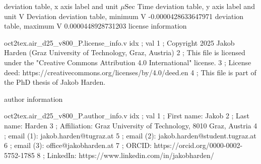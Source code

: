 \expandafter\def\csname oct2tex.air_d25_v800_P.dtabxlbl.d\endcsname{deviation table, x axis label and unit}
\expandafter\def\csname oct2tex.air_d25_v800_P.dtabxlbl.u\endcsname{\ensuremath{\mu\text{Sec}}}
\expandafter\def\csname oct2tex.air_d25_v800_P.dtabxlbl.v\endcsname{Time}
\expandafter\def\csname oct2tex.air_d25_v800_P.dtabylbl.d\endcsname{deviation table, y axis label and unit}
\expandafter\def\csname oct2tex.air_d25_v800_P.dtabylbl.u\endcsname{\ensuremath{\text{V}}}
\expandafter\def\csname oct2tex.air_d25_v800_P.dtabylbl.v\endcsname{Deviation}
\expandafter\def\csname oct2tex.air_d25_v800_P.dtabmin.d\endcsname{deviation table, minimum}
\expandafter\def\csname oct2tex.air_d25_v800_P.dtabmin.u\endcsname{\ensuremath{\text{V}}}
\expandafter\def\csname oct2tex.air_d25_v800_P.dtabmin.v\endcsname{-0.0000428633647971}
\expandafter\def\csname oct2tex.air_d25_v800_P.dtabmax.d\endcsname{deviation table, maximum}
\expandafter\def\csname oct2tex.air_d25_v800_P.dtabmax.u\endcsname{\ensuremath{\text{V}}}
\expandafter\def\csname oct2tex.air_d25_v800_P.dtabmax.v\endcsname{0.0000448928731203}
\expandafter\def\csname oct2tex.air_d25_v800_P.license_info.d\endcsname{license information}
\begin{filecontents}[overwrite]{oct2tex.air_d25_v800_P.license_info.v}
idx ; val
1 ; Copyright 2025 Jakob Harden (Graz University of Technology, Graz, Austria)
2 ; This file is licensed under the "Creative Commons Attribution 4.0 International" license.
3 ; License deed: https://creativecommons.org/licenses/by/4.0/deed.en
4 ; This file is part of the PhD thesis of Jakob Harden.
\end{filecontents}
\expandafter\def\csname oct2tex.air_d25_v800_P.author_info.d\endcsname{author information}
\begin{filecontents}[overwrite]{oct2tex.air_d25_v800_P.author_info.v}
idx ; val
1 ; First name: Jakob
2 ; Last name: Harden
3 ; Affiliation: Graz University of Technology, 8010 Graz, Austria
4 ; email (1): jakob.harden@tugraz.at
5 ; email (2): jakob.harden@student.tugraz.at
6 ; email (3): office@jakobharden.at
7 ; ORCID: https://orcid.org/0000-0002-5752-1785
8 ; LinkedIn: https://www.linkedin.com/in/jakobharden/
\end{filecontents}
